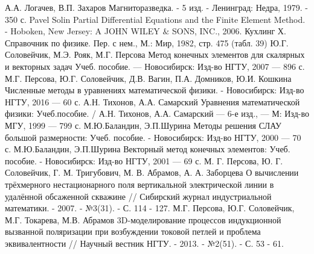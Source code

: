 \documentclass[14pt,a4paper]{extreport}
\begin{document}

%

\newpage
%
\tableofcontents
\newpage

\setcounter{page}{3}
%


%

%
%

\newpage

\renewcommand\bibname{СПИСОК ИСПОЛЬЗУЕМой ЛИТЕРАТУРЫ}

\begin{thebibliography}{00}
			А.А. Логачев, В.П. Захаров Магниторазведка. - 5 изд. - Ленинград: Недра, 1979. - 350 с.
    		Pavel Solin Partial Differential Equations and the Finite Element Method. - Hoboken, New Jersey: A JOHN WILEY $\&$ SONS, INC., 2006.
   			Кухлинг Х. Справочник по физике. Пер. с нем., М.: Мир, 1982, стр. 475 (табл. 39)
			Ю.Г. Соловейчик, М.Э. Рояк, М.Г. Персова Метод конечных элементов для скалярных и векторных задач Учеб. пособие. — Новосибирск: Изд-во НГТУ, 2007 — 896 с.
    		М.Г. Персова, Ю.Г. Соловейчик, Д.В. Вагин, П.А. Домников, Ю.И. Кошкина Численные методы в уравнениях математической физики.  - Новосибирск: Изд-во НГТУ, 2016 — 60 с.
			А.Н. Тихонов, А.А. Самарский Уравнения математической физики: Учеб.пособие. / А.Н. Тихонов, А.А. Самарский — 6-е изд., — М: Изд-во МГУ, 1999 — 799 с.
  			М.Ю.Баландин, Э.П.Шурина Методы решения СЛАУ большой размерности: Учеб. пособие. - Новосибирск: Изд-во НГТУ, 2000 — 70 с.
  			М.Ю.Баландин, Э.П.Шурина Векторный метод конечных элементов: Учеб. пособие. - Новосибирск: Изд-во НГТУ, 2001 — 69 с.
  			М. Г. Персова, Ю. Г. Соловейчик, Г. М. Тригубович, М. В. Абрамов, А. А. Заборцева О вычислении трёхмерного нестационарного поля вертикальной электрической линии в удалённой обсаженной скважине // Сибирский журнал индустриальной математики. - 2007. - №3(31). - С. 114 - 127.
  			М.Г. Персова, Ю.Г. Соловейчик, М.Г. Токарева, М.В. Абрамов 3D-моделирование процессов индукционной вызванной поляризации при возбуждении токовой петлей и проблема эквивалентности // Научный вестник НГТУ. - 2013. - №2(51). - С. 53 - 61.
\end{thebibliography}

\newpage
%
%

\end{document}
